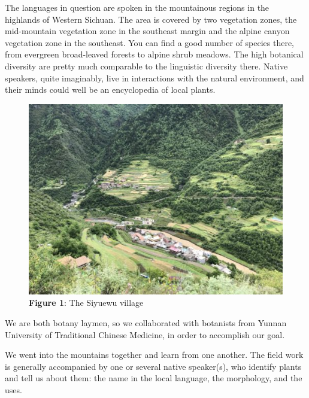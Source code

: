 \documentclass[
  a4paper,
  14pt,
  oneside,
  tablecaptionabove
]{scrbook}
\begin{document}
The languages in question are spoken in the mountainous regions in the
highlands of Western Sichuan. The area is covered by two vegetation
zones, the mid-mountain vegetation zone in the southeast margin and the
alpine canyon vegetation zone in the southeast. You can find a good
number of species there, from evergreen broad-leaved forests to alpine
shrub meadows. The high botanical diversity are pretty much comparable
to the linguistic diversity there. Native speakers, quite imaginably,
live in interactions with the natural environment, and their minds could
well be an encyclopedia of local plants.

\leavevmode\hypertarget{attachment_2143}{}%
\begin{figure}
\centering
\includegraphics[width=\textwidth]{images/IMG_7199-500x375.jpg}
\captionsetup{labelformat=empty}
\caption{\textbf{Figure 1}: The Siyuewu village}
\end{figure}

We are both botany laymen, so we collaborated with botanists from Yunnan
University of Traditional Chinese Medicine, in order to accomplish our
goal.

We went into the mountains together and learn from one another. The
field work is generally accompanied by one or several native speaker(s),
who identify plants and tell us about them: the name in the local
language, the morphology, and the uses.
\end{document}
